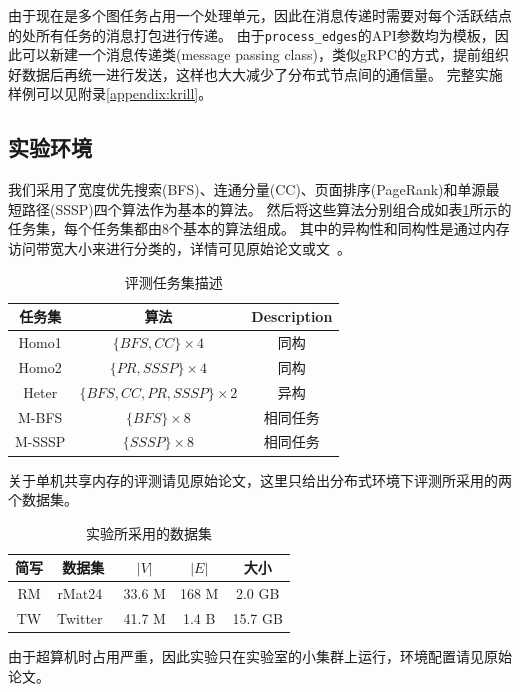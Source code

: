 \documentclass[logo,reportComp]{thesis}
\begin{document}
由于现在是多个图任务占用一个处理单元，因此在消息传递时需要对每个活跃结点的处所有任务的消息打包进行传递。
由于\verb'process_edges'的API参数均为模板，因此可以新建一个消息传递类(message passing class)，类似gRPC的方式，提前组织好数据后再统一进行发送，这样也大大减少了分布式节点间的通信量。
完整实施样例可以见附录\ref{appendix:krill}。

\subsection{实验环境}
我们采用了宽度优先搜索(BFS)、连通分量(CC)、页面排序(PageRank)和单源最短路径(SSSP)四个算法作为基本的算法。
然后将这些算法分别组合成如表\ref{tab:job_sets}所示的任务集，每个任务集都由8个基本的算法组成。
其中的异构性和同构性是通过内存访问带宽大小来进行分类的，详情可见原始论文或文~\cite{pan:congra_iccd_2017}。
\begin{table}[H]
\centering
\caption{评测任务集描述}
\label{tab:job_sets}
\begin{tabular}{|c|c|c|}\hline
\textbf{任务集} & \textbf{算法} & \textbf{Description} \\\hline
Homo1 & $\{BFS,CC\}\times 4$ & 同构\\\hline
Homo2 & $\{PR,SSSP\}\times 4$ & 同构\\\hline
Heter & $\{BFS,CC,PR,SSSP\}\times 2$ & 异构 \\\hline
M-BFS & $\{BFS\}\times 8$ & 相同任务 \\\hline
M-SSSP & $\{SSSP\}\times 8$ & 相同任务 \\\hline
\end{tabular}
\end{table}

关于单机共享内存的评测请见原始论文，这里只给出分布式环境下评测所采用的两个数据集。
\begin{table}[H]
\centering
\caption{实验所采用的数据集}
\label{tab:dataset}
\begin{tabular}{|c|c|c|c|c|}\hline
\textbf{简写} & \textbf{数据集} & \textbf{$|V|$} & \textbf{$|E|$} & \textbf{大小}\\\hline
RM & rMat24~\cite{graph_500} & 33.6 M & 168 M & 2.0 GB\\\hline
TW & Twitter~\cite{yang:TW_wsdm_2011} & 41.7 M & 1.4 B & 15.7 GB\\\hline
\end{tabular}
\end{table}

由于超算机时占用严重，因此实验只在实验室的小集群上运行，环境配置请见原始论文。
\end{document}
